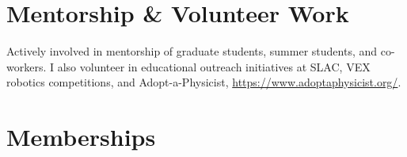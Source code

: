 \documentclass[11pt,a4paper,sans]{moderncv}        %
\begin{document}
\section{Mentorship \& Volunteer Work}
Actively involved in mentorship of graduate students, summer students, and co-workers. I also volunteer in educational outreach initiatives at SLAC, VEX robotics competitions, and Adopt-a-Physicist, \url{https://www.adoptaphysicist.org/}.

\section{Memberships}

\iffalse
\section{Recent Volunteer Work}
\cvitemwithcomment{Feb. 2021}{Cabrillo High School STEM Talk}{}
\cvitemwithcomment{Aug. 2019}{SAGE-S Summer Camp for Girls, SLAC}{}
\cvitemwithcomment{Jan. 2020}{Science Bowl, SLAC}{}
\cvitemwithcomment{Otc. 2017, 2018, 2020}{Adopt-a-Physicist}{}


\section{Programming Languages}
\cvitem{Proficient in}{ASTRA, OPAL-T, Python, MATLAB}
\cvitem{Prior experience with}{IMPACT, Genesis, C/C++}

\fi
\end{document}
